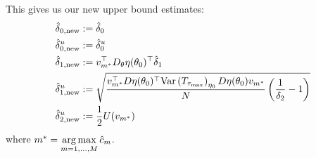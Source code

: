 \documentclass[10pt]{article}
\newcommand{\new}{\operatorname{new}}
\begin{document}
This gives us our new upper bound estimates:
\begin{align*}
    \hat{\delta}_{0, \new} &:= \hat{\delta}_0 \\
    \hat{\delta}_{0, \new}^u &:= \hat{\delta}_0^u \\
    \hat{\delta}_{1, \new} &:= v_{m^*}^\top D_\theta \eta(\theta_0)^\top \hat{\delta}_1 \\
    \hat{\delta}_{1, \new}^u &:= \sqrt{%
        \frac{v_{m^*}^\top D\eta(\theta_0)^\top \var{T_{\tau_{\max}}}_{\eta_0} D\eta(\theta_0) v_{m^*}}{N} 
        \paren{\frac{1}{\delta_2}-1}
    } \\
    \hat{\delta}_{2, \new}^u &:= 
    \frac{1}{2} U(v_{m^*})
\end{align*}
where $m^* = \operatorname*{arg\,max}\limits_{m=1,\ldots, M} \hat{c}_m$.




{}

\end{document}
